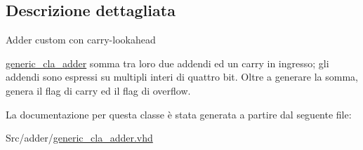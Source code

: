 \subsection{Descrizione dettagliata}
Adder custom con carry-\/lookahead

\hyperlink{classgeneric__cla__adder}{generic\+\_\+cla\+\_\+adder} somma tra loro due addendi ed un carry in ingresso; gli addendi sono espressi su multipli interi di quattro bit. Oltre a generare la somma, genera il flag di carry ed il flag di overflow. 

La documentazione per questa classe è stata generata a partire dal seguente file\+:\begin{DoxyCompactItemize}
\item 
Src/adder/\hyperlink{generic__cla__adder_8vhd}{generic\+\_\+cla\+\_\+adder.\+vhd}\end{DoxyCompactItemize}
